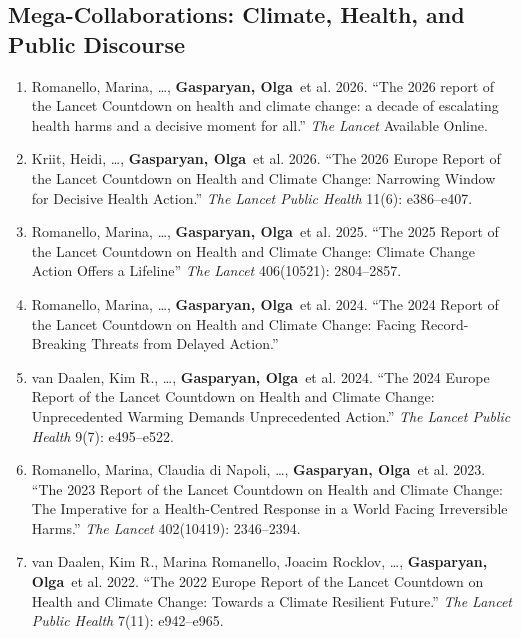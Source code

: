 \documentclass[10pt]{article}
\newcommand{\me}{\textbf{Gasparyan, Olga}}
\begin{document}
\subsection{Mega-Collaborations: Climate, Health, and Public Discourse}
\begin{enumerate}[resume]
    \item Romanello, Marina, \ldots, \me\ et al. 2026. ``The 2026 report of the Lancet Countdown on health and climate change: a decade of escalating health harms and a decisive moment for all.'' \textit{The Lancet} Available Online. 

    \item Kriit, Heidi, \ldots, \me\ et al. 2026. ``The 2026 Europe Report of the Lancet Countdown on Health and Climate Change: Narrowing Window for Decisive Health Action.'' \textit{The Lancet Public Health} 11(6): e386--e407.

    \item Romanello, Marina, \ldots, \me\ et al. 2025. ``The 2025 Report of the Lancet Countdown on Health and Climate Change: Climate Change Action Offers a Lifeline'' \textit{The Lancet} 406(10521): 2804--2857. 

    \item Romanello, Marina, \ldots, \me\ et al. 2024. ``The 2024 Report of the Lancet Countdown on Health and Climate Change: Facing Record-Breaking Threats from Delayed Action.'' 

    \item van Daalen, Kim R., \ldots, \me\ et al. 2024. ``The 2024 Europe Report of the Lancet Countdown on Health and Climate Change: Unprecedented Warming Demands Unprecedented Action.'' \textit{The Lancet Public Health} 9(7): e495--e522. 

    \item Romanello, Marina, Claudia di Napoli, \ldots, \me\ et al. 2023. ``The 2023 Report of the Lancet Countdown on Health and Climate Change: The Imperative for a Health-Centred Response in a World Facing Irreversible Harms.'' \textit{The Lancet} 402(10419): 2346--2394.

    \item van Daalen, Kim R., Marina Romanello, Joacim Rocklov, \ldots, \me\ et al. 2022. ``The 2022 Europe Report of the Lancet Countdown on Health and Climate Change: Towards a Climate Resilient Future.'' \textit{The Lancet Public Health} 7(11): e942--e965.
\end{enumerate}
\end{document}
